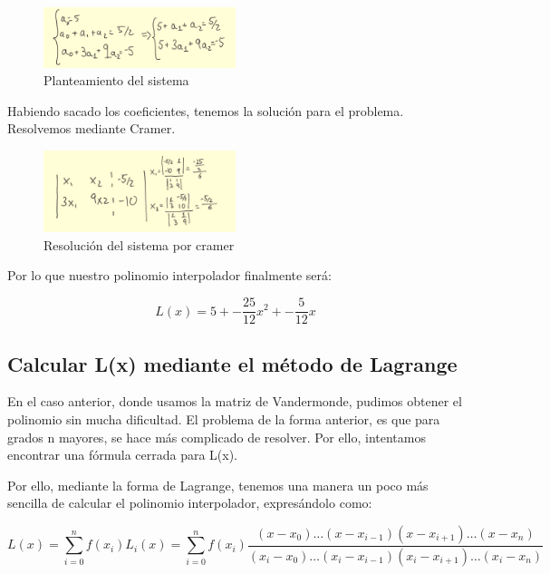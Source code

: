 \documentclass{article}
\begin{document}
\begin{figure}[ht]
	\center
	\includegraphics[width=0.5\textwidth]{src/sistemaplanteado.jpg}
	\caption{Planteamiento del sistema}
\end{figure}

Habiendo sacado los coeficientes, tenemos la solución para el problema. Resolvemos mediante Cramer.

\begin{figure}[h]
	\center
	\includegraphics[width=0.5\textwidth]{src/cramer.jpg}
	\caption{Resolución del sistema por cramer}
\end{figure}

Por lo que nuestro polinomio interpolador finalmente será:

\begin{equation}
  L(x) = 5 + -\frac{25}{12}x^{2} + -\frac{5}{12}x
\end{equation}

\newpage


\subsection{Calcular L(x) mediante el método de Lagrange}

En el caso anterior, donde usamos la matriz de Vandermonde, pudimos obtener el polinomio sin mucha dificultad. El problema de la forma anterior, es que para grados n mayores, se hace más complicado de resolver. Por ello, intentamos encontrar una fórmula cerrada para L(x).

Por ello, mediante la forma de Lagrange, tenemos una manera un poco más sencilla de calcular el polinomio interpolador, expresándolo como:

\begin{equation}
  L(x) = \sum_{i=0}^{n} f(x_i) L_i(x) = \sum_{i=0}^{n} f(x_i) \frac{(x - x_0) \dots (x - x_{i-1})(x - x_{i+1}) \dots (x - x_n)}{(x_i - x_0) \dots (x_i - x_{i-1})(x_i - x_{i+1}) \dots (x_i - x_n)}
\end{equation}
\end{document}
